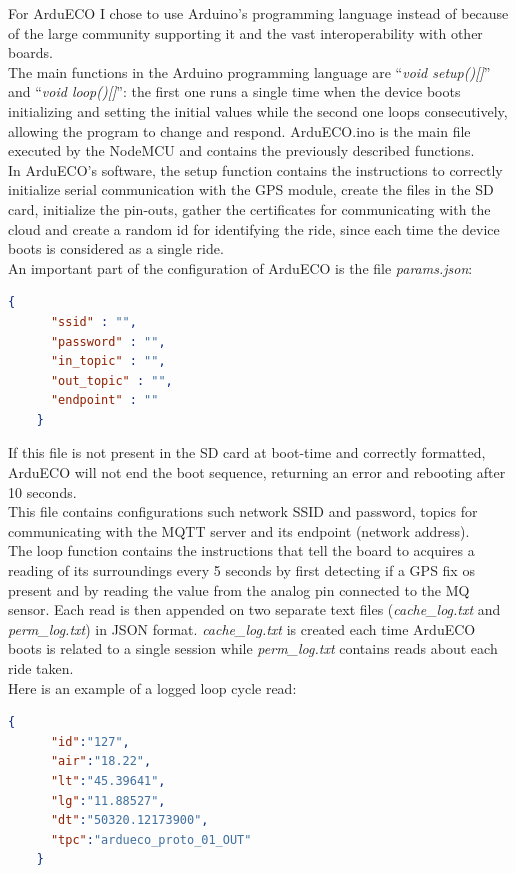\documentclass[conference]{IEEEtran}
\begin{document}
		For ArduECO I chose to use Arduino's programming language instead of \cite{micropyhton} because of the large community supporting it and the vast interoperability with other boards.\\
		The main functions in the Arduino programming language are ``\textit{void setup()[]}'' and ``\textit{void loop()[]}'': the first one runs a single time when the device boots initializing and setting the initial values while the second one loops consecutively, allowing the program to change and respond.
		ArduECO.ino is the main file executed by the NodeMCU and contains the previously described functions.\\
		In ArduECO's software, the setup function contains the instructions to correctly initialize serial communication with the GPS module, create the files in the SD card, initialize the pin-outs, gather the certificates for communicating with the cloud and create a random id for identifying the ride, since each time the device boots is considered as a single ride.\\
		An important part of the configuration of ArduECO is the file \textit{params.json}:
		\begin{lstlisting}[language=json,firstnumber=1]
    {
	  "ssid" : "",
	  "password" : "",
	  "in_topic" : "",
	  "out_topic" : "",
	  "endpoint" : ""
    }
		\end{lstlisting}
		If this file is not present in the SD card at boot-time and correctly formatted, ArduECO will not end the boot sequence, returning an error and rebooting after 10 seconds.\\
		This file contains configurations such network SSID and password, topics for communicating with the MQTT server and its endpoint (network address).\\
		The loop function contains the instructions that tell the board to acquires a reading of its surroundings every 5 seconds by first detecting if a GPS fix os present and by reading the value from the analog pin connected to the MQ sensor.
		Each read is then appended on two separate text files (\textit{cache\_log.txt} and \textit{perm\_log.txt}) in JSON format. 
		\textit{cache\_log.txt} is created each time ArduECO boots is related to a single session while \textit{perm\_log.txt} contains reads about each ride taken.\\
		Here is an example of a logged loop cycle read:
		\begin{lstlisting}[language=json,firstnumber=1]		
    {
	  "id":"127",
	  "air":"18.22",
	  "lt":"45.39641",
	  "lg":"11.88527",
	  "dt":"50320.12173900",
	  "tpc":"ardueco_proto_01_OUT"
    }
		\end{lstlisting}	
\end{document}
